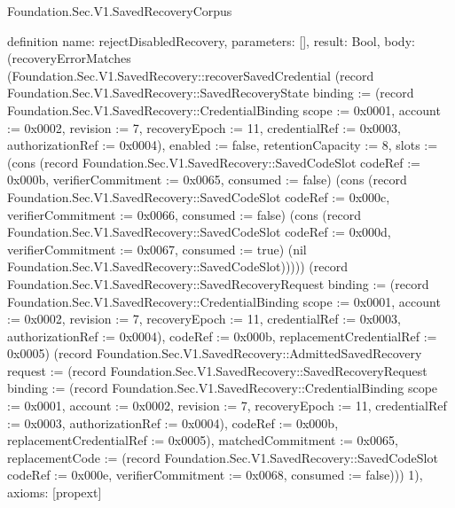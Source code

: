 \begin{lexlean}{Foundation.Sec.V1.SavedRecoveryCorpus}
\begin{semanticmodule}
definition{
  name: rejectDisabledRecovery,
  parameters: [],
  result: Bool,
  body: (recoveryErrorMatches (Foundation.Sec.V1.SavedRecovery::recoverSavedCredential (record Foundation.Sec.V1.SavedRecovery::SavedRecoveryState {binding := (record Foundation.Sec.V1.SavedRecovery::CredentialBinding {scope := 0x0001, account := 0x0002, revision := 7, recoveryEpoch := 11, credentialRef := 0x0003, authorizationRef := 0x0004}), enabled := false, retentionCapacity := 8, slots := (cons (record Foundation.Sec.V1.SavedRecovery::SavedCodeSlot {codeRef := 0x000b, verifierCommitment := 0x0065, consumed := false}) (cons (record Foundation.Sec.V1.SavedRecovery::SavedCodeSlot {codeRef := 0x000c, verifierCommitment := 0x0066, consumed := false}) (cons (record Foundation.Sec.V1.SavedRecovery::SavedCodeSlot {codeRef := 0x000d, verifierCommitment := 0x0067, consumed := true}) (nil Foundation.Sec.V1.SavedRecovery::SavedCodeSlot))))}) (record Foundation.Sec.V1.SavedRecovery::SavedRecoveryRequest {binding := (record Foundation.Sec.V1.SavedRecovery::CredentialBinding {scope := 0x0001, account := 0x0002, revision := 7, recoveryEpoch := 11, credentialRef := 0x0003, authorizationRef := 0x0004}), codeRef := 0x000b, replacementCredentialRef := 0x0005}) (record Foundation.Sec.V1.SavedRecovery::AdmittedSavedRecovery {request := (record Foundation.Sec.V1.SavedRecovery::SavedRecoveryRequest {binding := (record Foundation.Sec.V1.SavedRecovery::CredentialBinding {scope := 0x0001, account := 0x0002, revision := 7, recoveryEpoch := 11, credentialRef := 0x0003, authorizationRef := 0x0004}), codeRef := 0x000b, replacementCredentialRef := 0x0005}), matchedCommitment := 0x0065, replacementCode := (record Foundation.Sec.V1.SavedRecovery::SavedCodeSlot {codeRef := 0x000e, verifierCommitment := 0x0068, consumed := false})})) 1),
  axioms: [propext]
}


\end{semanticmodule}
\end{lexlean}

